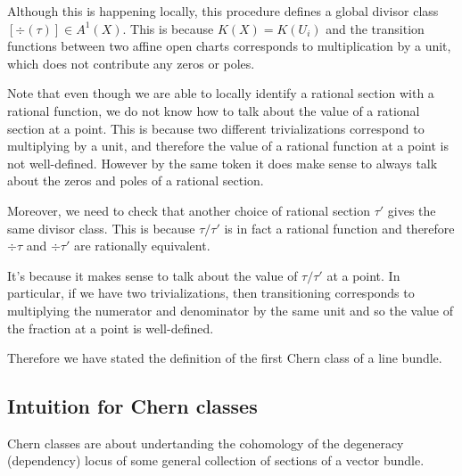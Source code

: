 \documentclass[12pt]{article}
\begin{document}
\hfill

Although this is happening locally, this procedure defines a global divisor class $[\div(\tau)]\in A^1(X)$. This is because
$K(X) = K(U_i)$ and the transition functions between two affine open charts corresponds to multiplication by a unit, 
which does not contribute any zeros or poles.

\begin{remark}
    Note that even though we are able to locally 
    identify a rational section with a rational function, we do not know how to talk about 
    the value of a rational section at a point. This is because two different trivializations correspond to 
    multiplying by a unit, and therefore the value of a rational function at a point is not well-defined. However by the same
    token it does make sense to always talk about the zeros and poles of a rational section.
\end{remark}

Moreover, we need to check that another choice of rational section $\tau'$ gives the same divisor class. This is because
$\tau/\tau'$ is in fact a rational function and therefore $\div{\tau}$ and $\div{\tau'}$ are rationally equivalent.

\hfill 

 It's because it makes sense to talk about the value of $\tau/\tau'$ at a point.
In particular, if we have two trivializations, then transitioning corresponds to multiplying the numerator and denominator
by the same unit and so the value of the fraction at a point is well-defined.

\hfill

Therefore we have stated the definition of the first Chern class of a line bundle.
\subsection{Intuition for Chern classes}
Chern classes are about undertanding the cohomology of the degeneracy (dependency) locus of some general
collection of sections of a vector bundle.
\end{document}
